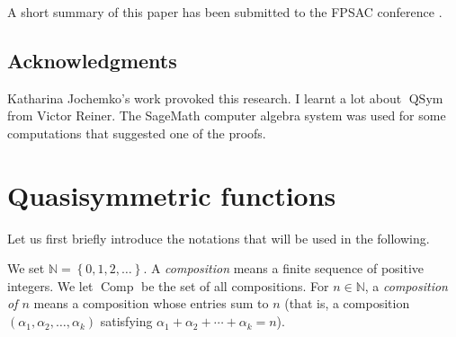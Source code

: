 \documentclass[numbers=enddot,12pt,final,onecolumn,notitlepage,abstracton]{scrartcl}%
\theoremstyle{definition}
\newcommand{\Comp}{{\operatorname{Comp}}}
\newcommand{\QSym}{{\operatorname{QSym}}}
\newcommand{\NN}{{\mathbb{N}}}
\begin{document}
A short summary of this paper has been submitted to the FPSAC
conference \cite{Gri-extabs}.

\subsection*{Acknowledgments}

Katharina Jochemko's work \cite{Joch} provoked this research.
I learnt a lot about $\QSym$ from Victor Reiner. The SageMath
computer algebra system \cite{SageMath} was used for some
computations that suggested one of the proofs.

\section{Quasisymmetric functions}
\label{sect.qsym-intro}

Let us first briefly introduce the notations that will be used in the
following.

We set $\NN = \left\{0, 1, 2, \ldots\right\}$. A \textit{composition}
means a finite sequence of positive integers. We let $\Comp$ be the set
of all compositions. For $n \in \NN$, a \textit{composition of $n$}
means a composition whose entries sum to $n$ (that is, a composition
$\left(\alpha_1, \alpha_2, \ldots, \alpha_k\right)$ satisfying
$\alpha_1 + \alpha_2 + \cdots + \alpha_k = n$).
\end{document}
